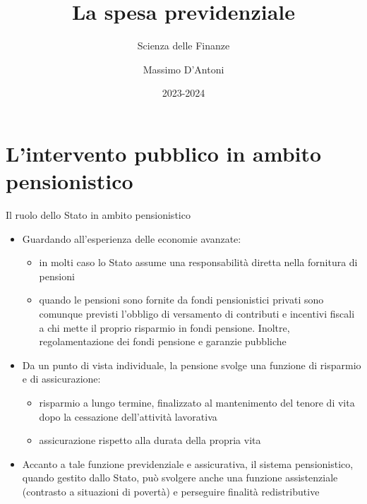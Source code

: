 \documentclass[aspectratio=64,11pt]{beamer}
\institute{Università di Siena}
\author{Massimo D'Antoni}
\date{2023-2024}
\title{La spesa previdenziale}
\subtitle{Scienza delle Finanze}
\begin{document}
\maketitle

\section{L'intervento pubblico in ambito pensionistico}

\begin{frame}{Il ruolo dello Stato in ambito pensionistico}
\begin{itemize}
\item Guardando all'esperienza delle economie avanzate:
\begin{itemize}
\item in molti caso lo Stato assume una responsabilità diretta nella fornitura di
pensioni
\item quando le pensioni sono fornite da fondi pensionistici privati sono
comunque previsti l'obbligo di versamento di contributi e incentivi
fiscali a chi mette il proprio risparmio in fondi pensione. Inoltre,
regolamentazione dei fondi pensione e garanzie pubbliche
\end{itemize}

\item Da un punto di vista individuale, la pensione svolge una funzione di
\alert{risparmio} e di \alert{assicurazione}:
\begin{itemize}
\item risparmio a lungo termine, finalizzato al mantenimento del tenore di vita
dopo la cessazione dell'attività lavorativa
\item assicurazione rispetto alla durata della propria vita
\end{itemize}

\item Accanto a tale funzione \alert{previdenziale} e \alert{assicurativa}, il sistema
pensionistico, quando gestito dallo Stato, può svolgere anche una funzione
\alert{assistenziale} (contrasto a situazioni di povertà) e perseguire finalità
\alert{redistributive}
\end{itemize}
\end{frame}
\end{document}
